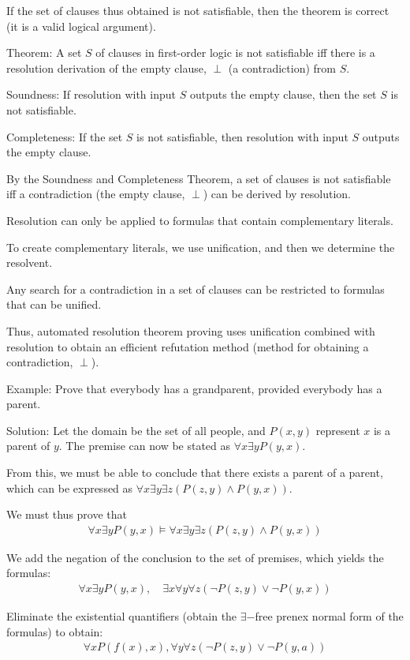 \documentclass{article}
\begin{document}
If the set of clauses thus obtained is not satisfiable, then the theorem is correct (it is a valid logical argument).

Theorem: A set $S$ of clauses in first-order logic is not satisfiable iff there is a resolution derivation of the empty clause, $\perp$ (a contradiction) from $S$.

Soundness: If resolution with input $S$ outputs the empty clause, then the set $S$ is not satisfiable.

Completeness: If the set $S$ is not satisfiable, then resolution with input $S$ outputs the empty clause.

By the Soundness and Completeness Theorem, a set of clauses is not satisfiable iff a contradiction (the empty clause, $\perp$) can be derived by resolution.

Resolution can only be applied to formulas that contain complementary literals.

To create complementary literals, we use unification, and then we determine the resolvent. 

Any search for a contradiction in a set of clauses can be restricted to formulas that can be unified. 

Thus, automated resolution theorem proving uses unification combined with resolution to obtain an efficient refutation method (method for obtaining a contradiction, $\perp$).


Example: Prove that everybody has a grandparent, provided everybody has a parent.

Solution: Let the domain be the set of all people, and $P(x,y)$ represent $x$ is a parent of $y$. The premise can now be stated as $\forall x \exists y P(y,x)$.

From this, we must be able to conclude that there exists a parent of a parent, which can be expressed as $\forall x \exists y \exists z (P(z,y) \wedge P(y,x))$.

We must thus prove that
\begin{align*}
   \forall x \exists y P(y,x) \vDash \forall x \exists y \exists z (P(z,y) \wedge P(y,x)) 
\end{align*}

We add the negation of the conclusion to the set of premises, which yields the formulas:
\begin{align*}
\forall x \exists y P(y,x), \quad \exists x \forall y \forall z (\neg P(z,y) \vee \neg P(y,x))
\end{align*}

Eliminate the existential quantifiers (obtain the $\exists-$free prenex normal form of the formulas) to obtain:
\begin{align*}
\forall x P(f(x),x), \forall y \forall z(\neg P(z,y) \vee \neg P(y,a))
\end{align*}
\end{document}
